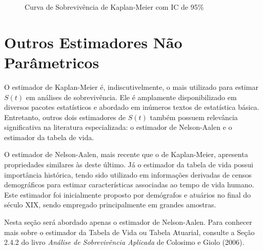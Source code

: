 \documentclass[
  12pt,
  letterpaper,
  DIV=11,
  numbers=noendperiod]{scrreprt}
\begin{document}
\begin{figure}[H]

\caption{\label{fig-SobrKM}Curva de Sobrevivência de Kaplan-Meier com IC
de 95\%}


\end{figure}%

\section{Outros Estimadores Não
Parâmetricos}\label{outros-estimadores-nuxe3o-paruxe2metricos}

O estimador de Kaplan-Meier é, indiscutivelmente, o mais utilizado para
estimar \(S(t)\) em análises de sobrevivência. Ele é amplamente
disponibilizado em diversos pacotes estatísticos e abordado em inúmeros
textos de estatística básica. Entretanto, outros dois estimadores de
\(S(t)\) também possuem relevância significativa na literatura
especializada: o estimador de Nelson-Aalen e o estimador da tabela de
vida.

O estimador de Nelson-Aalen, mais recente que o de Kaplan-Meier,
apresenta propriedades similares às deste último. Já o estimador da
tabela de vida possui importância histórica, tendo sido utilizado em
informações derivadas de censos demográficos para estimar
características associadas ao tempo de vida humano. Este estimador foi
inicialmente proposto por demógrafos e atuários no final do século XIX,
sendo empregado principalmente em grandes amostras.

Nesta seção será abordado apenas o estimador de Nelson-Aalen. Para
conhecer mais sobre o estimador da Tabela de Vida ou Tabela Atuarial,
consulte a Seção 2.4.2 do livro \emph{Análise de Sobrevivência Aplicada}
de Colosimo e Giolo (2006).
\end{document}

